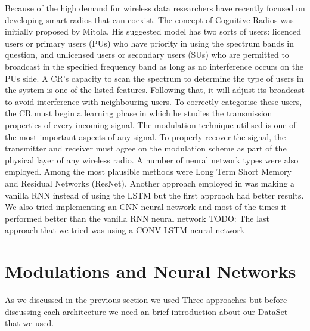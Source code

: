 \documentclass[12pt,a4paper]{article}
\begin{document}
    Because of the high demand for wireless data researchers have recently focused on developing smart radios that can coexist. \newline 
    The concept of Cognitive Radios was initially proposed by Mitola. \newline 
    His suggested model has two sorts of users: licenced users or primary users (PUs) who have priority in using the spectrum bands in question, and unlicensed users or secondary users (SUs) who are permitted to broadcast in the specified frequency band as long as no interference occurs on the PUs side. \newline
    A CR's capacity to scan the spectrum to determine the type of users in the system is one of the listed features. \newline
    Following that, it will adjust its broadcast to avoid interference with neighbouring users. \newline
    To correctly categorise these users, the CR must begin a learning phase in which he studies the transmission properties of every incoming signal. The modulation technique utilised is one of the most important aspects of any signal. \newline
    To properly recover the signal, the transmitter and receiver must agree on the modulation scheme as part of the physical layer of any wireless radio. \newline
    A number of neural network types were also employed. Among the most plausible methods were Long Term Short Memory and Residual Networks (ResNet). \newline
    Another approach employed in was making a vanilla RNN instead of using the LSTM but the first approach had better results. \newline
    We also tried implementing an CNN neural network and most of the times it performed better than the vanilla RNN neural network\newline
    TODO:\newline
    The last approach that we tried was using a CONV-LSTM neural network \newline

    \newpage

    \section{Modulations and Neural Networks}
    As we discussed in the previous section we used Three approaches but before discussing each architecture we need an brief introduction about our DataSet that we used.
\end{document}

